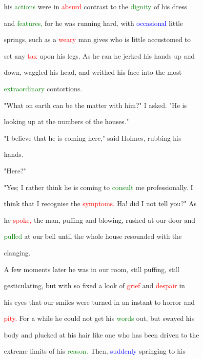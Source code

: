  his \textcolor{green}{actions} were in \textcolor{red}{absurd} contrast to the \textcolor{green}{dignity} of his dress

 and \textcolor{green}{features,} for he was running hard, with \textcolor{blue}{occasional} little

 springs, such as a \textcolor{red}{weary} man gives who is little accustomed to

 set any \textcolor{red}{tax} upon his legs. As he ran he jerked his hands up and

 down, waggled his head, and writhed his face into the most

 \textcolor{green}{extraordinary} contortions.



 "What on earth can be the matter with him?" I asked. "He is

 looking up at the numbers of the houses."



 "I believe that he is coming here," said Holmes, rubbing his

 hands.



 "Here?"



 "Yes; I rather think he is coming to \textcolor{green}{consult} me professionally. I

 think that I recognise the \textcolor{red}{symptoms.} Ha! did I not tell you?" As

 he \textcolor{red}{spoke,} the man, puffing and blowing, rushed at our door and

 \textcolor{green}{pulled} at our bell until the whole house resounded with the

 clanging.



 A few moments later he was in our room, still puffing, still

 gesticulating, but with so fixed a look of \textcolor{red}{grief} and \textcolor{red}{despair} in

 his eyes that our \textcolor{BurntOrange}{smiles} were turned in an instant to \textcolor{BurntOrange}{horror} and

 \textcolor{red}{pity.} For a while he could not get his \textcolor{green}{words} out, but swayed his

 body and plucked at his hair like one who has been driven to the

 extreme limits of his \textcolor{green}{reason.} Then, \textcolor{blue}{suddenly} springing to his

